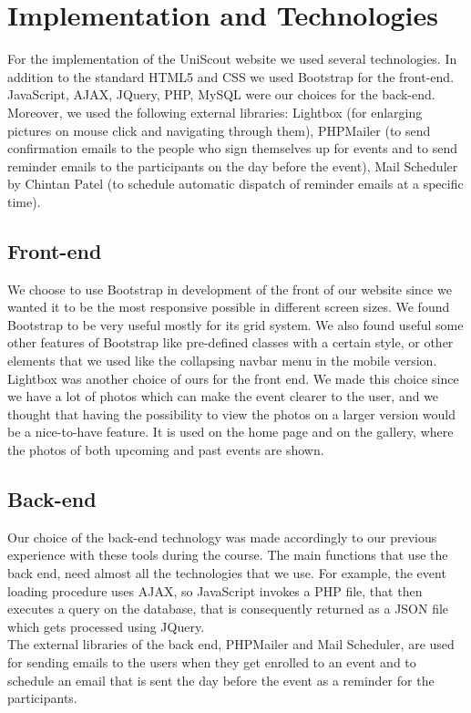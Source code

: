 \documentclass[a4paper]{article}
\begin{document}
	\section{Implementation and Technologies}
	For the implementation of the UniScout website we used several technologies. In addition to the standard HTML5 and CSS we used Bootstrap for the front-end. JavaScript, AJAX, JQuery, PHP, MySQL were our choices for the back-end.\\
	Moreover, we used the following external libraries: Lightbox (for enlarging pictures on mouse click and navigating through them), PHPMailer (to send confirmation emails to the people who sign themselves up for events and to send reminder emails to the participants on the day before the event), Mail Scheduler by Chintan Patel (to schedule automatic dispatch of reminder emails at a specific time).

	\subsection{Front-end}
	We choose to use Bootstrap in development of the front of our website since we wanted it to be the most responsive possible in different screen sizes. We found Bootstrap to be very useful mostly for its grid system. We also found useful some other features of Bootstrap like pre-defined classes with a certain style, or other elements that we used like the collapsing navbar menu in the mobile version.\\
	Lightbox was another choice of ours for the front end. We made this choice since we have a lot of photos which can make the event clearer to the user, and we thought that having the possibility to view the photos on a larger version would be a nice-to-have feature. It is used on the home page and on the gallery, where the photos of both upcoming and past events are shown.\\
	\subsection{Back-end}
	Our choice of the back-end technology was made accordingly to our previous experience with these tools during the course. The main functions that use the back end, need almost all the technologies that we use. For example, the event loading procedure uses AJAX, so JavaScript invokes a PHP file, that then executes a query on the database, that is consequently returned as a JSON file which gets processed using JQuery.\\
	The external libraries of the back end, PHPMailer and Mail Scheduler, are used for sending emails to the users when they get enrolled to an event and to schedule an email that is sent the day before the event as a reminder for the participants.
\end{document}
